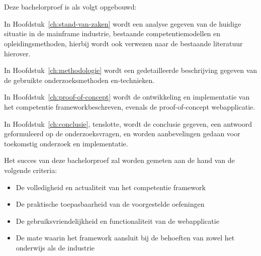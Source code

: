 \section{}%
\label{sec:opzet-bachelorproef}

Deze bachelorproef is als volgt opgebouwd:

In Hoofdstuk~\ref{ch:stand-van-zaken} wordt een analyse gegeven van de huidige situatie in de mainframe
industrie, bestaande competentiemodellen en opleidingsmethoden, hierbij wordt
ook verwezen naar de bestaande literatuur hierover.

In Hoofdstuk~\ref{ch:methodologie} wordt een gedetailleerde beschrijving gegeven van de gebruikte
onderzoeksmethoden en-technieken.

In Hoofdstuk~\ref{ch:proof-of-concept} wordt de ontwikkeling en implementatie van het competentie frameworkbeschreven, evenals de proof-of-concept webapplicatie.

In Hoofdstuk~\ref{ch:conclusie}, tenslotte, wordt de conclusie gegeven, een antwoord geformuleerd
op de onderzoeksvragen, en worden aanbevelingen gedaan voor toekomstig onderzoek en implementatie.

Het succes van deze bachelorproef zal worden gemeten aan de hand van de volgende criteria:
\begin{itemize}
\item De volledigheid en actualiteit van het competentie framework
\item De praktische toepasbaarheid van de voorgestelde oefeningen
\item De gebruiksvriendelijkheid en functionaliteit van de webapplicatie
\item De mate waarin het framework aansluit bij de behoeften van zowel het onderwijs als de industrie
\end{itemize}




